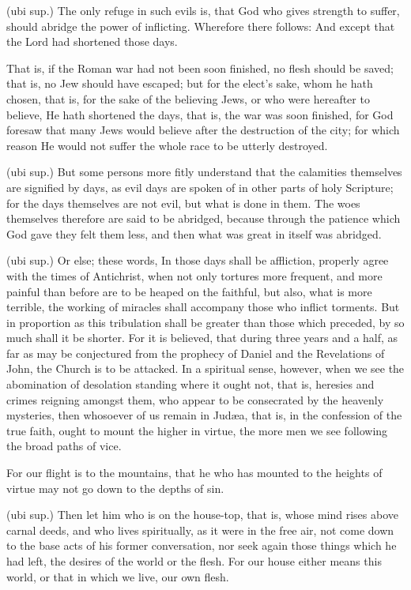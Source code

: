  (ubi sup.) The only refuge in such evils is, that God who gives strength to suffer, should abridge the power of inflicting. Wherefore there follows: And except that the Lord had shortened those days.

 That is, if the Roman war had not been soon finished, no flesh should be saved; that is, no Jew should have escaped; but for the elect’s sake, whom he hath chosen, that is, for the sake of the believing Jews, or who were hereafter to believe, He hath shortened the days, that is, the war was soon finished, for God foresaw that many Jews would believe after the destruction of the city; for which reason He would not suffer the whole race to be utterly destroyed.

 (ubi sup.) But some persons more fitly understand that the calamities themselves are signified by days, as evil days are spoken of in other parts of holy Scripture; for the days themselves are not evil, but what is done in them. The woes themselves therefore are said to be abridged, because through the patience which God gave they felt them less, and then what was great in itself was abridged.

 (ubi sup.) Or else; these words, In those days shall be affliction, properly agree with the times of Antichrist, when not only tortures more frequent, and more painful than before are to be heaped on the faithful, but also, what is more terrible, the working of miracles shall accompany those who inflict torments. But in proportion as this tribulation shall be greater than those which preceded, by so much shall it be shorter. For it is believed, that during three years and a half, as far as may be conjectured from the prophecy of Daniel and the Revelations of John, the Church is to be attacked. In a spiritual sense, however, when we see the abomination of desolation standing where it ought not, that is, heresies and crimes reigning amongst them, who appear to be consecrated by the heavenly mysteries, then whosoever of us remain in Judæa, that is, in the confession of the true faith, ought to mount the higher in virtue, the more men we see following the broad paths of vice.

 For our flight is to the mountains, that he who has mounted to the heights of virtue may not go down to the depths of sin.

 (ubi sup.) Then let him who is on the house-top, that is, whose mind rises above carnal deeds, and who lives spiritually, as it were in the free air, not come down to the base acts of his former conversation, nor seek again those things which he had left, the desires of the world or the flesh. For our house either means this world, or that in which we live, our own flesh.

